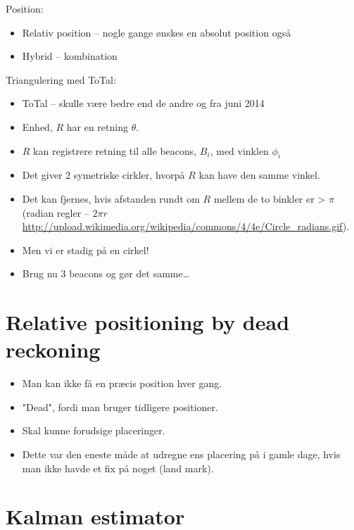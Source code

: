 \documentclass[oneside, 10pt]{article}
\begin{document}
Position:
\begin{itemize}
	\item Relativ position -- nogle gange ønskes en absolut position også
	\item Hybrid -- kombination
\end{itemize}

Triangulering med ToTal:
\begin{itemize}
	\item ToTal -- skulle være bedre end de andre og fra juni 2014
	\item Enhed, $R$ har en retning $\theta$. 
	\item $R$ kan registrere retning til alle beacons, $B_i$, med vinklen $\phi_i$
	\item Det giver 2 symetriske cirkler, hvorpå $R$ kan have den samme vinkel.
	\item Det kan fjernes, hvis afstanden rundt om $R$ mellem de to binkler er > $\pi$ (radian regler -- $2\pi r$ \url{http://upload.wikimedia.org/wikipedia/commons/4/4e/Circle_radians.gif}).
	\item[] Men vi er stadig på en cirkel!

	\item Brug nu 3 beacons og gør det samme\dots
\end{itemize}









\newpage
\section{Relative positioning by dead reckoning}

\begin{itemize}
	\item Man kan ikke få en præcis position hver gang.
	\item "Dead", fordi man bruger tidligere positioner.
	\item Skal kunne forudsige placeringer.
	\item Dette var den eneste måde at udregne ens placering på i gamle dage, hvis man ikke havde et fix på noget (land mark).
\end{itemize}







\newpage
\section{Kalman estimator}
\end{document}
